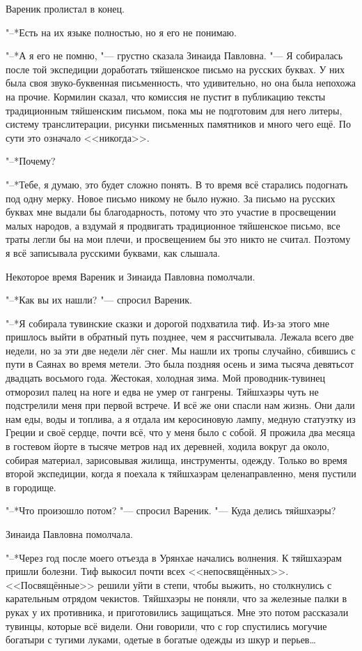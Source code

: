 Вареник пролистал в конец.

"--*Есть на их языке полностью, но я его не понимаю.

"--*А я его не помню, "--- грустно сказала Зинаида Павловна.
"--- Я собиралась после той экспедиции доработать тяйшенское письмо на русских буквах.
У них была своя звуко-буквенная письменность, что удивительно, но она была непохожа на прочие.
Кормилин сказал, что комиссия не пустит в публикацию тексты традиционным тяйшенским письмом, пока мы не подготовим для него литеры, систему транслитерации, рисунки письменных памятников и много чего ещё.
По сути это означало <<никогда>>.

"--*Почему?

"--*Тебе, я думаю, это будет сложно понять.
В то время всё старались подогнать под одну мерку.
Новое письмо никому не было нужно.
За письмо на русских буквах мне выдали бы благодарность, потому что это участие в просвещении малых народов, а вздумай я продвигать традиционное тяйшенское письмо, все траты легли бы на мои плечи, и просвещением бы это никто не считал.
Поэтому я всё записывала русскими буквами, как слышала.

Некоторое время Вареник и Зинаида Павловна помолчали.

"--*Как вы их нашли? "--- спросил Вареник.

"--*Я собирала тувинские сказки и дорогой подхватила тиф.
Из-за этого мне пришлось выйти в обратный путь позднее, чем я рассчитывала.
Лежала всего две недели, но за эти две недели лёг снег.
Мы нашли их тропы случайно, сбившись с пути в Саянах во время метели.
Это была поздняя осень и зима тысяча девятьсот двадцать восьмого года.
Жестокая, холодная зима.
Мой проводник-тувинец отморозил палец на ноге и едва не умер от гангрены.
Тяйшхаэры чуть не подстрелили меня при первой встрече.
И всё же они спасли нам жизнь.
Они дали нам еды, воды и топлива, а я отдала им керосиновую лампу, медную статуэтку из Греции и своё сердце, почти всё, что у меня было с собой.
Я прожила два месяца в гостевом йорте в тысяче метров над их деревней, ходила вокруг да около, собирая материал, зарисовывая жилища, инструменты, одежду.
Только во время второй экспедиции, когда я поехала к тяйшхаэрам целенаправленно, меня пустили в городище.

"--*Что произошло потом? "--- спросил Вареник.
"--- Куда делись тяйшхаэры?

Зинаида Павловна помолчала.

"--*Через год после моего отъезда в Урянхае начались волнения.
К тяйшхаэрам пришли болезни.
Тиф выкосил почти всех <<непосвящённых>>.
<<Посвящённые>> решили уйти в степи, чтобы выжить, но столкнулись с карательным отрядом чекистов.
Тяйшхаэры не поняли, что за железные палки в руках у их противника, и приготовились защищаться.
Мне это потом рассказали тувинцы, которые всё видели.
Они говорили, что с гор спустились могучие богатыри с тугими луками, одетые в богатые одежды из шкур и перьев\ldots{}

